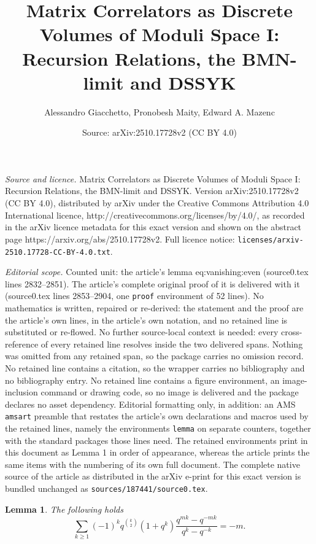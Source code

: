 \documentclass[10pt,a4paper]{amsart}
\title{Matrix Correlators as Discrete Volumes of Moduli Space I: \\ Recursion Relations, the BMN-limit and DSSYK}
\author{Alessandro Giacchetto, Pronobesh Maity, Edward A. Mazenc}
\date{Source: arXiv:2510.17728v2 (CC BY 4.0)}
\newtheorem{lemma}{Lemma}
\begin{document}
\maketitle

\noindent\emph{Source and licence.} Matrix Correlators as Discrete Volumes of Moduli Space I: \\ Recursion Relations, the BMN-limit and DSSYK. Version arXiv:2510.17728v2 (CC BY 4.0), distributed by arXiv under the Creative Commons Attribution 4.0 International licence, http://creativecommons.org/licenses/by/4.0/, as recorded in the arXiv licence metadata for this exact version and shown on the abstract page https://arxiv.org/abs/2510.17728v2. Full licence notice: \texttt{licenses/arxiv-2510.17728-CC-BY-4.0.txt}.\par\smallskip

\noindent\textit{Editorial scope.} Counted unit: the article's lemma eq:vanishing:even (source0.tex lines 2832--2851). The article's complete original proof of it is delivered with it (source0.tex lines 2853--2904, one \texttt{proof} environment of 52 lines). No mathematics is written, repaired or re-derived: the statement and the proof are the article's own lines, in the article's own notation, and no retained line is substituted or re-flowed.  No further source-local context is needed: every cross-reference of every retained line resolves inside the two delivered spans.  Nothing was omitted from any retained span, so the package carries no omission record.  No retained line contains a citation, so the wrapper carries no bibliography and no bibliography entry.  No retained line contains a figure environment, an image-inclusion command or drawing code, so no image is delivered and the package declares no asset dependency.  Editorial formatting only, in addition: an AMS \texttt{amsart} preamble that restates the article's own declarations and macros used by the retained lines, namely the environments \texttt{lemma} on separate counters, together with the standard packages those lines need.  The retained environments print in this document as Lemma 1 in order of appearance, whereas the article prints the same items with the numbering of its own full document.  The complete native source of the article as distributed in the arXiv e-print for this exact version is bundled unchanged as \texttt{sources/187441/source0.tex}.
\begin{lemma}
	The following holds
	\begin{equation}
		\label{eq:vanishing:even}
		\sum_{k \ge 1}
		(-1)^{k}
		q^{\binom{k}{2}} (1 + q^k)
			\frac{q^{mk} - q^{-mk}}{q^k - q^{-k}}
		=
		- m.
	\end{equation}
\end{lemma}
\end{document}
